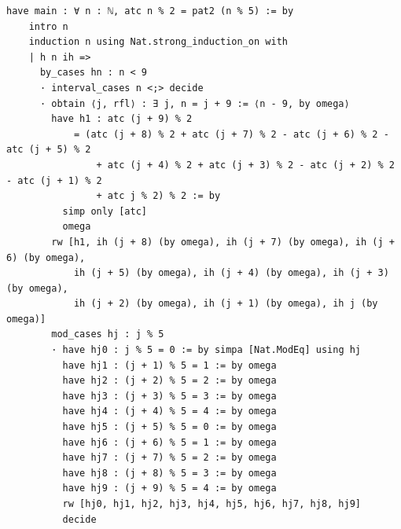 \documentclass[11pt]{article}
\theoremstyle{definition}
\begin{document}
\begin{lstlisting}[caption={Theorem~\ref{thm:t2}: the clean inner lemma, the
induction shell, the mod-2 collapse and the first residue branch, verbatim
excerpt of the final artifact (lines 200--228, sha256 \texttt{f1aa7099}; line
endings normalized from CRLF). The theorem closes at line 277 of the artifact by
rewriting the hypothesis into the inner statement; the other four residue
branches are identical in form with different residues.},label={lst:t2step}]
  have main : ∀ n : ℕ, atc n % 2 = pat2 (n % 5) := by
    intro n
    induction n using Nat.strong_induction_on with
    | h n ih =>
      by_cases hn : n < 9
      · interval_cases n <;> decide
      · obtain ⟨j, rfl⟩ : ∃ j, n = j + 9 := ⟨n - 9, by omega⟩
        have h1 : atc (j + 9) % 2
            = (atc (j + 8) % 2 + atc (j + 7) % 2 - atc (j + 6) % 2 - atc (j + 5) % 2
                + atc (j + 4) % 2 + atc (j + 3) % 2 - atc (j + 2) % 2 - atc (j + 1) % 2
                + atc j % 2) % 2 := by
          simp only [atc]
          omega
        rw [h1, ih (j + 8) (by omega), ih (j + 7) (by omega), ih (j + 6) (by omega),
            ih (j + 5) (by omega), ih (j + 4) (by omega), ih (j + 3) (by omega),
            ih (j + 2) (by omega), ih (j + 1) (by omega), ih j (by omega)]
        mod_cases hj : j % 5
        · have hj0 : j % 5 = 0 := by simpa [Nat.ModEq] using hj
          have hj1 : (j + 1) % 5 = 1 := by omega
          have hj2 : (j + 2) % 5 = 2 := by omega
          have hj3 : (j + 3) % 5 = 3 := by omega
          have hj4 : (j + 4) % 5 = 4 := by omega
          have hj5 : (j + 5) % 5 = 0 := by omega
          have hj6 : (j + 6) % 5 = 1 := by omega
          have hj7 : (j + 7) % 5 = 2 := by omega
          have hj8 : (j + 8) % 5 = 3 := by omega
          have hj9 : (j + 9) % 5 = 4 := by omega
          rw [hj0, hj1, hj2, hj3, hj4, hj5, hj6, hj7, hj8, hj9]
          decide
\end{lstlisting}
\end{document}
